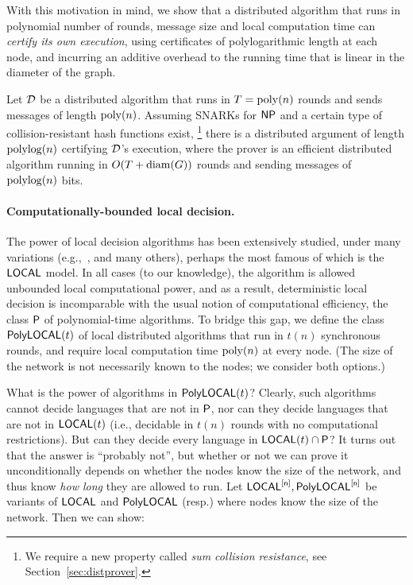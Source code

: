 	With this motivation in mind, we show that a distributed algorithm that runs in polynomial number of rounds, message size
	and local computation time can \emph{certify its own execution}, using certificates of polylogarithmic length
	at each node, and incurring an additive overhead to the running time that 
	is linear in the diameter of the graph.
	

\begin{theorem}
    Let $\mathcal{D}$ be a distributed algorithm that runs in $T = \operatorname{poly}(n)$ rounds
    and sends messages of length $\operatorname{poly}(n)$.
    Assuming SNARKs for ${\mathsf{NP}}$ %
    and %
    a certain type of collision-resistant hash functions exist,%
    \footnote{We require a new property called \emph{sum collision resistance}, see Section~\ref{sec:distprover}.}
    there is a distributed argument of length $\operatorname{polylog}(n)$
    certifying $\mathcal{D}$'s execution, where the prover is an efficient distributed algorithm
    running in $O(T + \operatorname{diam}(G))$ rounds and sending messages of $\operatorname{polylog}(n)$ bits.
    \label{thm:distprover_informal}
\end{theorem}

\paragraph{Computationally-bounded local decision.}
The power of local decision algorithms has been extensively studied, under many variations (e.g.,~\cite{NS95,fraigniaud2013can,fraigniaud2013towards}, and many others),
perhaps the most famous of which is the ${\mathsf{LOCAL}}$ model.
In all cases (to our knowledge), the algorithm is allowed unbounded local computational power, and as a result,
deterministic local decision is incomparable with the usual notion of computational efficiency, the class ${\mathsf{P}}$
of polynomial-time algorithms.
To bridge this gap, we define the class $\mathsf{PolyLOCAL}(t)$ of local distributed algorithms that run in 
$t(n)$ synchronous rounds, and require local computation time $\operatorname{poly}(n)$ at every node.
(The size of the network is not necessarily known to the nodes;
we consider both options.)

What is the power of algorithms in $\mathsf{PolyLOCAL}(t)$?
Clearly, such algorithms cannot decide languages that are not in ${\mathsf{P}}$, nor can they decide languages 
that are not in ${\mathsf{LOCAL}}(t)$ (i.e., decidable in $t(n)$ rounds with no computational restrictions).
But can they decide every language in ${\mathsf{LOCAL}}(t) \cap {\mathsf{P}}$?
It turns out that the answer is ``probably not'', 
but whether or not we can prove it unconditionally depends on whether the nodes know the size of the network,
and thus know \emph{how long} they are allowed to run.
Let ${\mathsf{LOCAL}}^{[\mathsf{n}]}, \mathsf{PolyLOCAL}^{[\mathsf{n}]}$ be variants of ${\mathsf{LOCAL}}$ and $\mathsf{PolyLOCAL}$ (resp.) where nodes know the size of the network.
Then we can show:

